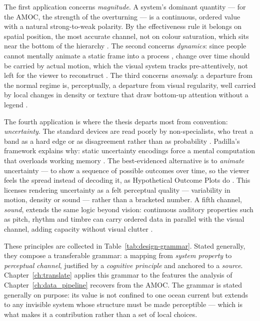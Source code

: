 The first application concerns \emph{magnitude}. A system's dominant quantity --- for the AMOC, the strength of the overturning --- is a continuous, ordered value with a natural strong-to-weak polarity. By the effectiveness rule it belongs on spatial position, the most accurate channel, not on colour saturation, which sits near the bottom of the hierarchy \citep{clevelandmcgill1984, tversky2019}. The second concerns \emph{dynamics}: since people cannot mentally animate a static frame into a process \citep{sterman2008, cronin2009}, change over time should be carried by actual motion, which the visual system tracks pre-attentively, not left for the viewer to reconstruct \citep{ware2021}. The third concerns \emph{anomaly}: a departure from the normal regime is, perceptually, a departure from visual regularity, well carried by local changes in density or texture that draw bottom-up attention without a legend \citep{bertin1983, ware2021}.

The fourth application is where the thesis departs most from convention: \emph{uncertainty}. The standard devices are read poorly by non-specialists, who treat a band as a hard edge or as disagreement rather than as probability \citep{mcmahon2015, padilla2018}. Padilla's framework explains why: static uncertainty encodings force a mental computation that overloads working memory \citep{padilla2018}. The best-evidenced alternative is to \emph{animate} uncertainty --- to show a sequence of possible outcomes over time, so the viewer feels the spread instead of decoding it, as Hypothetical Outcome Plots do \citep{hullman2015hops, kale2019hops}. This licenses rendering uncertainty as a felt perceptual quality --- variability in motion, density or sound --- rather than a bracketed number. A fifth channel, \emph{sound}, extends the same logic beyond vision: continuous auditory properties such as pitch, rhythm and timbre can carry ordered data in parallel with the visual channel, adding capacity without visual clutter \citep{hermann2011}.

These principles are collected in Table~\ref{tab:design-grammar}. Stated generally, they compose a transferable grammar: a mapping from \emph{system property} to \emph{perceptual channel}, justified by a \emph{cognitive principle} and anchored to a \emph{source}. Chapter~\ref{ch:translate} applies this grammar to the features the analysis of Chapter~\ref{ch:data_pipeline} recovers from the AMOC. The grammar is stated generally on purpose: its value is not confined to one ocean current but extends to any invisible system whose structure must be made perceptible --- which is what makes it a contribution rather than a set of local choices.


